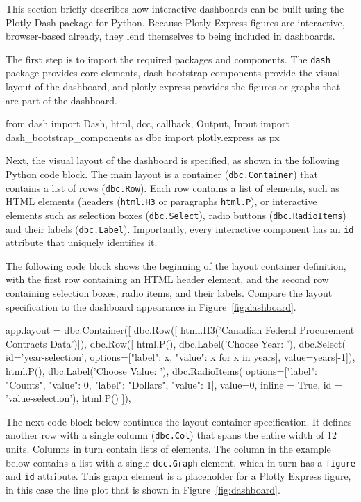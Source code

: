\begin{withcode}
This section briefly describes how interactive dashboards can be built using the Plotly Dash package for Python. Because Plotly Express figures are interactive, browser-based already, they lend themselves to being included in dashboards. 

The first step is to import the required packages and components. The \texttt{dash} package provides core elements, dash bootstrap components provide the visual layout of the dashboard, and plotly express provides the figures or graphs that are part of the dashboard.

\begin{pythoncode}
from dash import Dash, html, dcc, callback, Output, Input
import dash_bootstrap_components as dbc
import plotly.express as px
\end{pythoncode}

Next, the visual layout of the dashboard is specified, as shown in the following Python code block. The main layout is a container (\texttt{dbc.Container}) that contains a list of rows (\texttt{dbc.Row}). Each row contains a list of elements, such as HTML elements (headers (\texttt{html.H3} or paragraphs \texttt{html.P}), or interactive elements such as selection boxes (\texttt{dbc.Select}), radio buttons (\texttt{dbc.RadioItems}) and their labels (\texttt{dbc.Label}). Importantly, every interactive component has an \texttt{id} attribute that uniquely identifies it. 

The following code block shows the beginning of the layout container definition, with the first row containing an HTML header element, and the second row containing selection boxes, radio items, and their labels. Compare the layout specification to the dashboard appearance in Figure~\ref{fig:dashboard}.

\begin{pythoncode}
app.layout = dbc.Container([
  dbc.Row([
    html.H3('Canadian Federal Procurement Contracts Data')]),
  dbc.Row([
    html.P(),
    dbc.Label('Choose Year: '),
    dbc.Select(
      id='year-selection',
      options=[{"label": x, "value": x} for x in years],
      value=years[-1]),
    html.P(),
    dbc.Label('Choose Value: '),
    dbc.RadioItems(
      options=[{"label": "Counts", "value": 0},
               {"label": "Dollars", "value": 1}],
      value=0, inline = True,
      id = 'value-selection'),
    html.P() ]),
\end{pythoncode}

The next code block below continues the layout container specification. It defines another row with a single column (\texttt{dbc.Col}) that spans the entire width of 12 units. Columns in turn contain lists of elements. The column in the example below contains a list with a single \texttt{dcc.Graph} element, which in turn has a \texttt{figure} and \texttt{id} attribute. This graph element is a placeholder for a Plotly Express figure, in this case the line plot that is shown in Figure~\ref{fig:dashboard}.


\end{withcode}
